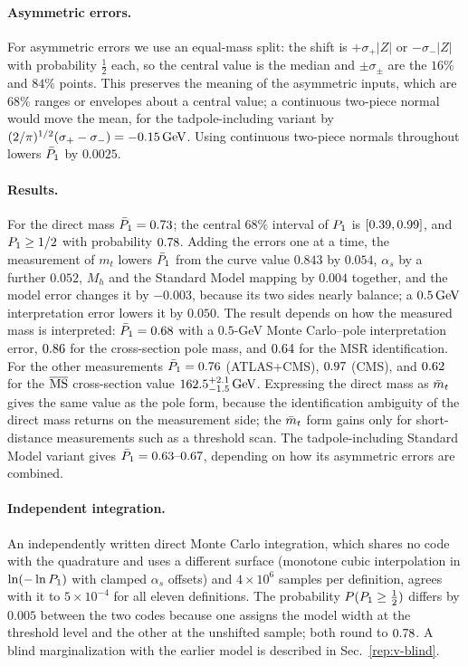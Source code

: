 \paragraph{Asymmetric errors.}
For asymmetric errors we use an equal-mass split: the shift is $+\sigma_+|Z|$ or $-\sigma_-|Z|$ with probability $\frac12$ each, so the central value is the median and $\pm\sigma_\pm$ are the $16\%$ and $84\%$ points.
This preserves the meaning of the asymmetric inputs, which are $68\%$ ranges or envelopes about a central value; a continuous two-piece normal would move the mean, for the tadpole-including variant by $(2/\pi)^{1/2}(\sigma_+-\sigma_-)=-0.15\,\mathrm{GeV}$. %
Using continuous two-piece normals throughout lowers $\bar P_1$ by $0.0025$. %

\paragraph{Results.}
For the direct mass $\bar P_1=0.73$; the central $68\%$ interval of $P_1$ is $[0.39,0.99]$, and $P_1\ge1/2$ with probability $0.78$. %
Adding the errors one at a time, the measurement of $m_t$ lowers $\bar P_1$ from the curve value $0.843$ by $0.054$, $\alpha_s$ by a further $0.052$, $M_h$ and the Standard Model mapping by $0.004$ together, and the model error changes it by $-0.003$, because its two sides nearly balance; a $0.5\,\mathrm{GeV}$ interpretation error lowers it by $0.050$. %
The result depends on how the measured mass is interpreted: $\bar P_1=0.68$ with a $0.5$-GeV Monte Carlo--pole interpretation error, $0.86$ for the cross-section pole mass, and $0.64$ for the MSR identification. %
For the other measurements $\bar P_1=0.76$ (ATLAS+CMS), $0.97$ (CMS), and $0.62$ for the $\overline{\mathrm{MS}}$ cross-section value $162.5^{+2.1}_{-1.5}\,\mathrm{GeV}$. %
Expressing the direct mass as $\bar m_t$ gives the same value as the pole form, because the identification ambiguity of the direct mass returns on the measurement side; the $\bar m_t$ form gains only for short-distance measurements such as a threshold scan. %
The tadpole-including Standard Model variant gives $\bar P_1=0.63\text{--}0.67$, depending on how its asymmetric errors are combined. %

\paragraph{Independent integration.}
An independently written direct Monte Carlo integration, which shares no code with the quadrature and uses a different surface (monotone cubic interpolation in $\ln(-\ln P_1)$ with clamped $\alpha_s$ offsets) and $4\times10^6$ samples per definition, agrees with it to $5\times10^{-4}$ for all eleven definitions. %
The probability $P(P_1\ge\frac12)$ differs by $0.005$ between the two codes because one assigns the model width at the threshold level and the other at the unshifted sample; both round to $0.78$. %
A blind marginalization with the earlier model is described in Sec.~\ref{rep:v-blind}.

